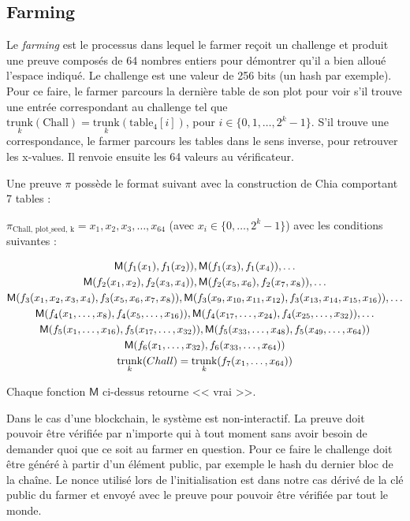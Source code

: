 \subsection{Farming}

Le \emph{farming} est le processus dans lequel le farmer reçoit un challenge et produit une preuve composés de 64 nombres entiers pour démontrer qu'il a bien alloué l'espace indiqué. Le challenge est une valeur de 256 bits (un hash par exemple). Pour ce faire, le farmer parcours la dernière table de son plot pour voir s'il trouve une entrée correspondant au challenge tel que $\underset{k}{\mathrm{trunk}}(\mathrm{Chall})=\underset{k}{\mathrm{trunk}}(\mathrm{table_4}[i])$, pour $i \in \{0,1,\dots,2^k-1\}$. S'il trouve une correspondance, le farmer parcours les tables dans le sens inverse, pour retrouver les x-values. Il renvoie ensuite les 64 valeurs au vérificateur.

Une preuve $\pi$ possède le format suivant avec la construction de Chia \cite{chia:construction} comportant 7 tables :

$\pi_{\textrm{Chall, plot\_seed, k}}=x_1, x_2, x_3, \dots, x_{64}$ (avec $x_i \in \{0, \dots, 2^k-1\}$) avec les conditions suivantes :

\begin{gather*}
  \mathsf{M}(f_1(x_1), f_1(x_2)), \mathsf{M}(f_1(x_3), f_1(x_4)), \dots \\
  \mathsf{M}(f_2(x_1, x_2), f_2(x_3, x_4)), \mathsf{M}(f_2(x_5, x_6), f_2(x_7, x_8)), \dots \\
  \mathsf{M}(f_3(x_1, x_2, x_3, x_4), f_3(x_5, x_6, x_7, x_8)), \mathsf{M}(f_3(x_9, x_{10}, x_{11}, x_{12}), f_3(x_{13}, x_{14}, x_{15}, x_{16})), \dots \\
  \mathsf{M}(f_4(x_1, \dots, x_8), f_4(x_5, \dots, x_{16})), \mathsf{M}(f_4(x_{17}, \dots, x_{24}), f_4(x_{25}, \dots, x_{32})), \dots \\
  \mathsf{M}(f_5(x_1, \dots, x_{16}), f_5(x_{17}, \dots, x_{32})), \mathsf{M}(f_5(x_{33}, \dots, x_{48}), f_5(x_{49}, \dots, x_{64})) \\
  \mathsf{M}(f_6(x_1, \dots, x_{32}), f_6(x_{33}, \dots, x_{64})) \\
  \underset{k}{\mathrm{trunk}}(Chall)=\underset{k}{\mathrm{trunk}}(f_7(x_1, \dots, x_{64}))
\end{gather*}

Chaque fonction $\mathsf{M}$ ci-dessus retourne << vrai >>.

Dans le cas d'une blockchain, le système est non-interactif. La preuve doit pouvoir être vérifiée par n'importe qui à tout moment sans avoir besoin de demander quoi que ce soit au farmer en question. Pour ce faire le challenge doit être généré à partir d'un élément public, par exemple le hash du dernier bloc de la chaîne. Le nonce utilisé lors de l'initialisation est dans notre cas dérivé de la clé public du farmer et envoyé avec le preuve pour pouvoir être vérifiée par tout le monde.

